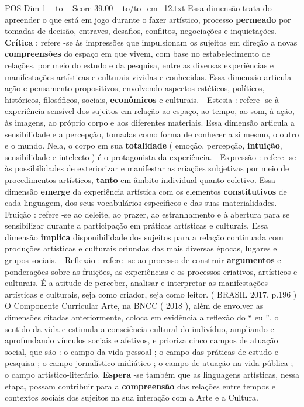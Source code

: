 \begin{textsample}{POS Dim 1 – to – Score 39.00 – to/to\_em\_12.txt}
Essa dimensão trata do apreender o que está em jogo durante o fazer artístico, processo \textbf{permeado} por tomadas de decisão, entraves, desafios, conflitos, negociações e inquietações. - \textbf{Crítica} : refere -se às impressões que impulsionam os sujeitos em direção a novas \textbf{compreensões} do espaço em que vivem, com base no estabelecimento de relações, por meio do estudo e da pesquisa, entre as diversas experiências e manifestações artísticas e culturais vividas e conhecidas.
Essa dimensão articula ação e pensamento propositivos, envolvendo aspectos estéticos, políticos, históricos, filosóficos, sociais, \textbf{econômicos} e culturais. - Estesia : refere -se à experiência sensível dos sujeitos em relação ao espaço, ao tempo, ao som, à ação, às imagens, ao próprio corpo e aos diferentes materiais.
Essa dimensão articula a sensibilidade e a percepção, tomadas como forma de conhecer a si mesmo, o outro e o mundo.
Nela, o corpo em sua \textbf{totalidade} ( emoção, percepção, \textbf{intuição}, sensibilidade e intelecto ) é o protagonista da experiência. - Expressão : refere -se às possibilidades de exteriorizar e manifestar as criações subjetivas por meio de procedimentos artísticos, \textbf{tanto} em âmbito individual quanto coletivo.
Essa dimensão \textbf{emerge} da experiência artística com os elementos \textbf{constitutivos} de cada linguagem, dos seus vocabulários específicos e das suas materialidades. - Fruição : refere -se ao deleite, ao prazer, ao estranhamento e à abertura para se sensibilizar durante a participação em práticas artísticas e culturais.
Essa dimensão \textbf{implica} disponibilidade dos sujeitos para a relação continuada com produções artísticas e culturais oriundas das mais diversas épocas, lugares e grupos sociais. - Reflexão : refere -se ao processo de construir \textbf{argumentos} e ponderações sobre as fruições, as experiências e os processos criativos, artísticos e culturais.
É a atitude de perceber, analisar e interpretar as manifestações artísticas e culturais, seja como criador, seja como leitor. ( BRASIL 2017, p.196 ) O Componente Curricular Arte, na BNCC ( 2018 ), além de envolver as dimensões citadas anteriormente, coloca em evidência a reflexão do “ eu ”, o sentido da vida e estimula a consciência cultural do indivíduo, ampliando e aprofundando vínculos sociais e afetivos, e prioriza cinco campos de atuação social, que são : o campo da vida pessoal ; o campo das práticas de estudo e pesquisa ; o campo jornalístico-midiático ; o campo de atuação na vida pública ; o campo artístico-literário. \textbf{Espera} -se também que as linguagens artísticas, nessa etapa, possam contribuir para a \textbf{compreensão} das relações entre tempos e contextos sociais dos sujeitos na sua interação com a Arte e a Cultura.

\end{textsample}

